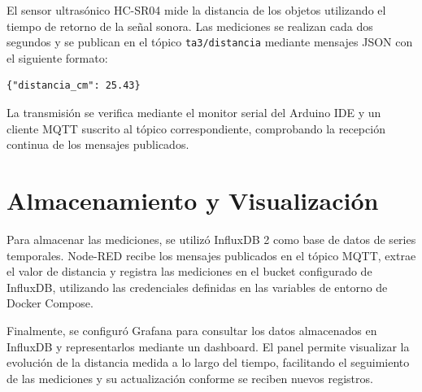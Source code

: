 \documentclass[a4paper, spanish]{article}
\begin{document}
El sensor ultrasónico HC-SR04 mide la distancia de los objetos utilizando el tiempo de retorno de la señal sonora. Las mediciones se realizan cada dos segundos y se publican en el tópico \texttt{ta3/distancia} mediante mensajes JSON con el siguiente formato:

\begin{lstlisting}
{"distancia_cm": 25.43}
\end{lstlisting}

La transmisión se verifica mediante el monitor serial del Arduino IDE y un cliente MQTT suscrito al tópico correspondiente, comprobando la recepción continua de los mensajes publicados.

\section{Almacenamiento y Visualización}

Para almacenar las mediciones, se utilizó InfluxDB 2 como base de datos de series temporales. Node-RED recibe los mensajes publicados en el tópico MQTT, extrae el valor de distancia y registra las mediciones en el bucket configurado de InfluxDB, utilizando las credenciales definidas en las variables de entorno de Docker Compose.

Finalmente, se configuró Grafana para consultar los datos almacenados en InfluxDB y representarlos mediante un dashboard. El panel permite visualizar la evolución de la distancia medida a lo largo del tiempo, facilitando el seguimiento de las mediciones y su actualización conforme se reciben nuevos registros.
\end{document}
